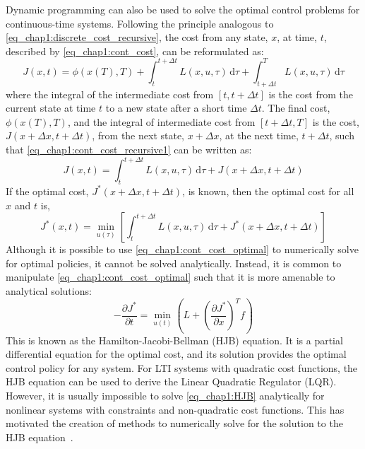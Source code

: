 Dynamic programming can also be used to solve the optimal control problems for continuous-time systems. Following the principle analogous to \eqref{eq_chap1:discrete_cost_recursive}, the cost from any state, $x$, at time, $t$, described by \eqref{eq_chap1:cont_cost}, can be reformulated as:
%
\begin{equation}
J(x,t)=\phi(x(T),T) + \int_{t}^{t+\Delta t}L(x,u,\tau) \, \text{d}\tau + \int_{t+\Delta t}^{T}L(x,u,\tau) \, \text{d}\tau
\label{eq_chap1:cont_cost_recursive1}
\end{equation}
%
where the integral of the intermediate cost from $[t,t+\Delta t]$ is the cost from the current state at time $t$ to a new state after a short time $\Delta t$. The final cost, $\phi(x(T),T)$, and the integral of intermediate cost from $[t+\Delta t, T]$ is the cost, $J(x+\Delta x,t+\Delta t)$, from the next state, $x+\Delta x$, at the next time, $t+\Delta t$, such that \eqref{eq_chap1:cont_cost_recursive1} can be written as:
%
\begin{equation}
J(x,t)=\int_{t}^{t+\Delta t}L(x,u,\tau) \, \text{d}\tau + J(x+\Delta x, t+\Delta t)
\label{eq_chap1:cont_cost_recursive2}
\end{equation}
%
If the optimal cost, $J^*(x+\Delta x, t+\Delta t)$, is known, then the optimal cost for all $x$ and $t$ is,
%
\begin{equation}
J^*(x,t)=\min_{u(\tau)} \left[ \int_{t}^{t+\Delta t}L(x,u,\tau) \, \text{d}\tau + J^*(x+\Delta x, t+\Delta t) \right]
\label{eq_chap1:cont_cost_optimal}
\end{equation}
%
Although it is possible to use \eqref{eq_chap1:cont_cost_optimal} to numerically solve for optimal policies, it cannot be solved analytically.
Instead, it is common to manipulate \eqref{eq_chap1:cont_cost_optimal} such that it is more amenable to analytical solutions:
%
\begin{equation}
-\frac{\partial J^*}{\partial t} = \min_{u(t)}\left(L + \left(\frac{\partial J^*}{\partial x}\right)^T f \right)
\label{eq_chap1:HJB}
\end{equation}
%
This is known as the Hamilton-Jacobi-Bellman (HJB) equation. It is a partial differential equation for the optimal cost, and its solution provides the optimal control policy for any system. For LTI systems with quadratic cost functions, the HJB equation can be used to derive the Linear Quadratic Regulator (LQR).
However, it is usually impossible to solve \eqref{eq_chap1:HJB} analytically for nonlinear systems with constraints and non-quadratic cost functions. This has motivated the creation of methods to numerically solve for the solution to the HJB equation~\cite{Beard:1997a,Beard:1998a,Boulbrachene:2001a,SaberiNik:2012a}.


